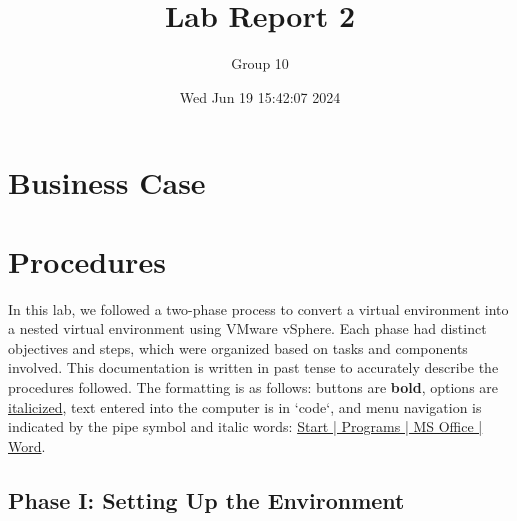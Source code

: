 \documentclass[letterpaper]{article}
\author{Group 10}
\date{Wed Jun 19 15:42:07 2024}
\title{Lab Report 2}
\begin{document}
\maketitle
\tableofcontents

\newpage

\section{Business Case}
\label{sec:org5c9e850}
\section{Procedures}
\label{sec:orga0b486b}

In this lab, we followed a two-phase process to convert a virtual environment into a nested virtual environment using VMware vSphere. Each phase had distinct objectives and steps, which were organized based on tasks and components involved. This documentation is written in past tense to accurately describe the procedures followed. The formatting is as follows: buttons are \textbf{bold}, options are \uline{italicized}, text entered into the computer is in `code`, and menu navigation is indicated by the pipe symbol and italic words: \uline{Start | Programs | MS Office | Word}.

\subsection{Phase I: Setting Up the Environment}
\label{sec:orgf1cfefb}
\end{document}
